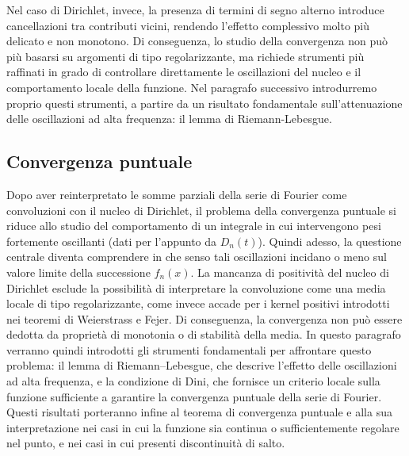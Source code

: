 \documentclass[a4paper,12pt]{report}
\begin{document}
Nel caso di Dirichlet, invece, la presenza di termini di segno alterno introduce cancellazioni tra contributi vicini, rendendo l’effetto complessivo molto più delicato e non monotono. Di conseguenza, lo studio della convergenza non può più basarsi su argomenti di tipo regolarizzante, ma richiede strumenti più raffinati in grado di controllare direttamente le oscillazioni del nucleo e il comportamento locale della funzione. Nel paragrafo successivo introdurremo proprio questi strumenti, a partire da un risultato fondamentale sull’attenuazione delle oscillazioni ad alta frequenza: il lemma di Riemann-Lebesgue.

\subsection{Convergenza puntuale}

Dopo aver reinterpretato le somme parziali della serie di Fourier come convoluzioni con il nucleo di Dirichlet, il problema della convergenza puntuale si riduce allo studio del comportamento di un integrale in cui intervengono pesi fortemente oscillanti (dati per l'appunto da $D_n(t)$). Quindi adesso, la questione centrale diventa comprendere in che senso tali oscillazioni incidano o meno sul valore limite della successione $f_n(x)$. La mancanza di positività del nucleo di Dirichlet esclude la possibilità di interpretare la convoluzione come una media locale di tipo regolarizzante, come invece accade per i kernel positivi introdotti nei teoremi di Weierstrass e Fejer. Di conseguenza, la convergenza non può essere dedotta da proprietà di monotonia o di stabilità della media. In questo paragrafo verranno quindi introdotti gli strumenti fondamentali per affrontare questo problema: il lemma di Riemann–Lebesgue, che descrive l’effetto delle oscillazioni ad alta frequenza, e la condizione di Dini, che fornisce un criterio locale sulla funzione sufficiente a garantire la convergenza puntuale della serie di Fourier. Questi risultati porteranno infine al teorema di convergenza puntuale e alla sua interpretazione nei casi in cui la funzione sia continua o sufficientemente regolare nel punto, e nei casi in cui presenti discontinuità di salto.
\end{document}
